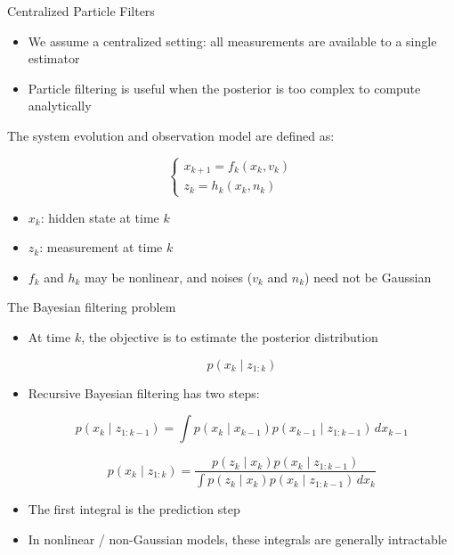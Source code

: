 \documentclass[aspectratio=169]{beamer}
\begin{document}
\begin{frame}{Centralized Particle Filters}

\begin{itemize}
    \item We assume a centralized setting: all measurements are available to a single estimator
    \item Particle filtering is useful when the posterior is too complex to compute analytically
\end{itemize}

\vspace{0.25cm}

The system evolution and observation model are defined as:

\[
\begin{cases}
x_{k+1} = f_k(x_k, v_k) \\[4pt]
z_k = h_k(x_k, n_k)
\end{cases}
\]

\vspace{0.2cm}

\begin{itemize}
    \item $x_k$: hidden state at time $k$
    \item $z_k$: measurement at time $k$
    \item $f_k$ and $h_k$ may be nonlinear, and noises ($v_k$ and $n_k$) need not be Gaussian
\end{itemize}

\end{frame}


\begin{frame}{The Bayesian filtering problem}

\begin{itemize}
    \item At time $k$, the objective is to estimate the posterior distribution

        \[
        p(x_k \mid z_{1:k})
        \]

    
    \item Recursive Bayesian filtering has two steps:

        \[
        p(x_k \mid z_{1:k-1})
        =
        \int p(x_k \mid x_{k-1}) p(x_{k-1} \mid z_{1:k-1}) \, dx_{k-1}
        \]

        \[
        p(x_k \mid z_{1:k})
        =
        \frac{
        p(z_k \mid x_k) p(x_k \mid z_{1:k-1})
        }{
        \int p(z_k \mid x_k) p(x_k \mid z_{1:k-1}) \, dx_k
        }
        \]

    \item The first integral is the prediction step
    \item In nonlinear / non-Gaussian models, these integrals are generally intractable
\end{itemize}
\end{frame}
\end{document}
